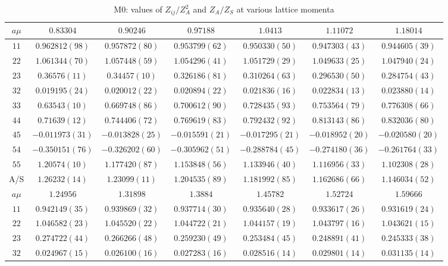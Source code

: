 \begin{table}
\begin{center}
\caption{M0: values of $Z_{ij}/Z_A^2$ and $Z_A/Z_S$ at various lattice momenta}
\begin{tabular}{c|c c c c c c}
\hline
\hline
$a\mu$ & $0.83304$ & $0.90246$ & $0.97188$ & $1.0413$ & $1.11072$ & $1.18014$ \\
\hline
$11$ & $0.962812(98)$ & $0.957872(80)$ & $0.953799(62)$ & $0.950330(50)$ & $0.947303(43)$ & $0.944605(39)$ \\
$22$ & $1.061344(70)$ & $1.057448(59)$ & $1.054296(41)$ & $1.051729(29)$ & $1.049633(25)$ & $1.047940(24)$ \\
$23$ & $0.36576(11)$ & $0.34457(10)$ & $0.326186(81)$ & $0.310264(63)$ & $0.296530(50)$ & $0.284754(43)$ \\
$32$ & $0.019195(24)$ & $0.020012(22)$ & $0.020894(22)$ & $0.021836(16)$ & $0.022834(13)$ & $0.023880(14)$ \\
$33$ & $0.63543(10)$ & $0.669748(86)$ & $0.700612(90)$ & $0.728435(93)$ & $0.753564(79)$ & $0.776308(66)$ \\
$44$ & $0.71639(12)$ & $0.744406(72)$ & $0.769619(83)$ & $0.792432(92)$ & $0.813143(86)$ & $0.832036(80)$ \\
$45$ & $-0.011973(31)$ & $-0.013828(25)$ & $-0.015591(21)$ & $-0.017295(21)$ & $-0.018952(20)$ & $-0.020580(20)$ \\
$54$ & $-0.350151(76)$ & $-0.326202(60)$ & $-0.305962(51)$ & $-0.288784(45)$ & $-0.274180(36)$ & $-0.261764(33)$ \\
$55$ & $1.20574(10)$ & $1.177420(87)$ & $1.153848(56)$ & $1.133946(40)$ & $1.116956(33)$ & $1.102308(28)$ \\
\hline
A/S & $1.26232(14)$ & $1.23099(11)$ & $1.204535(89)$ & $1.181992(85)$ & $1.162686(66)$ & $1.146034(52)$ \\
\hline
$a\mu$ & $1.24956$ & $1.31898$ & $1.3884$ & $1.45782$ & $1.52724$ & $1.59666$ \\
\hline
$11$ & $0.942149(35)$ & $0.939869(32)$ & $0.937714(30)$ & $0.935640(28)$ & $0.933617(26)$ & $0.931619(24)$ \\
$22$ & $1.046582(23)$ & $1.045520(22)$ & $1.044722(21)$ & $1.044157(19)$ & $1.043797(16)$ & $1.043621(15)$ \\
$23$ & $0.274722(44)$ & $0.266266(48)$ & $0.259230(49)$ & $0.253484(45)$ & $0.248891(41)$ & $0.245333(38)$ \\
$32$ & $0.024967(15)$ & $0.026100(16)$ & $0.027283(16)$ & $0.028516(14)$ & $0.029801(14)$ & $0.031135(14)$ \\

\end{tabular}
\end{center}
\end{table}
